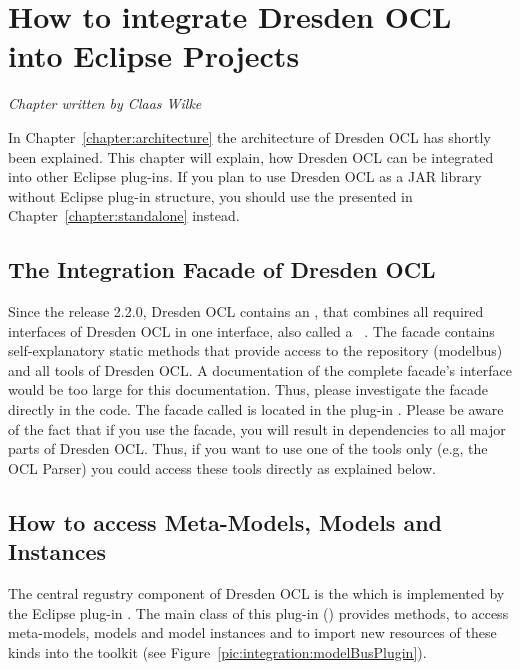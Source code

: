 \chapter{How to integrate Dresden OCL into Eclipse Projects}
\label{chapter:integration}

\begin{flushright}
\textit{Chapter written by Claas Wilke}
\end{flushright}

In Chapter~\ref{chapter:architecture} the architecture of Dresden OCL has shortly
been explained. This chapter will explain, how Dresden OCL can be integrated into
other Eclipse plug-ins. If you plan to use Dresden OCL as a \acs{JAR} library
without Eclipse plug-in structure, you should use the  presented in Chapter~\ref{chapter:standalone} instead.



\section{The Integration Facade of Dresden OCL}

Since the release 2.2.0, Dresden OCL contains an ,
that combines all required interfaces of Dresden OCL in one interface, also
called a ~\cite{gamma:dp}. The facade contains self-explanatory 
static methods that provide access to the repository (modelbus) and all tools 
of Dresden OCL. A documentation of the complete facade's interface would be too
large for this documentation. Thus, please investigate the facade directly in
the code. The facade called  is located in the 
plug-in . Please be aware of the fact that 
if you use the facade, you will result in dependencies to all major parts of
Dresden OCL. Thus, if you want to use one of the tools only (e.g, the \acs{OCL}
Parser) you could access these tools directly as explained below.



\section{How to access Meta-Models, Models and Instances}

The central regustry component of Dresden OCL is the 
which is implemented by the Eclipse plug-in 
. The main class of this plug-in 
() provides 
methods, to access meta-models, models and model instances and to import new
resources of these kinds into the toolkit (see 
Figure~\ref{pic:integration:modelBusPlugin}).

